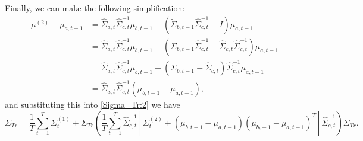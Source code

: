 \documentclass[12pt,leqno]{article}
\begin{document}
Finally, we can make the following simplification:
\begin{align*}
  \mu^{(2)} - \mu_{a,t-1} &= \widehat{\Sigma}_{a,t}\widehat{\Sigma}_{c,t}^{-1}\mu_{b,t-1} +
  (\widetilde{\Sigma}_{b,t-1}\widehat{\Sigma}_{c,t}^{-1}-I)\mu_{a,t-1}\\
  &= \widehat{\Sigma}_{a,t}\widehat{\Sigma}_{c,t}^{-1}\mu_{b,t-1} +
  (\widetilde{\Sigma}_{b,t-1}\widehat{\Sigma}_{c,t}^{-1}-\widehat{\Sigma}_{c,t}\widehat{\Sigma}_{c,t}^{-1})\mu_{a,t-1}\\
  &=  \widehat{\Sigma}_{a,t}\widehat{\Sigma}_{c,t}^{-1}\mu_{b,t-1} +
  (\widetilde{\Sigma}_{b,t-1}-\widehat{\Sigma}_{c,t})\widehat{\Sigma}_{c,t}^{-1}\mu_{a,t-1}\\
  &= \widehat{\Sigma}_{a,t}\widehat{\Sigma}_{c,t}^{-1}(\mu_{b,t-1} -\mu_{a,t-1}),
\end{align*}
and substituting this into \eqref{Sigma_Tr:2} we have
\begin{equation}\label{Sigma_Tr:3}
\overline{\Sigma}_{Tr}   =\frac{1}{T}\sum_{t=1}^T\Sigma^{(1)}_t+\Sigma_{Tr}\left(\frac{1}{T}\sum_{t=1}^T\widehat{\Sigma}_{c,t}^{-1}
   [\Sigma^{(2)}_t+(\mu_{b,t-1}-\mu_{a,t-1})(\mu_{b_t-1}-\mu_{a,t-1})^T]\widehat{\Sigma}_{c,t}^{-1}\right)\Sigma_{Tr}.
\end{equation}  
\end{document}
